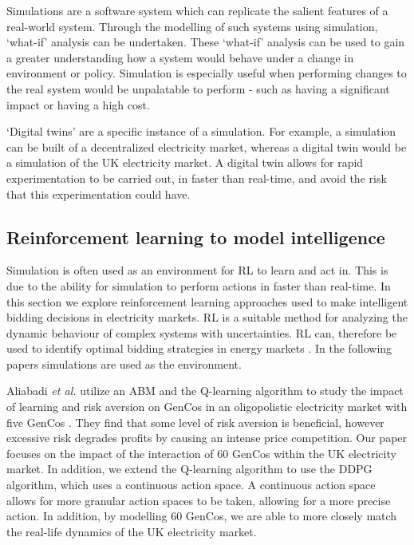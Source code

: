 \documentclass[conference]{IEEEtran}
\begin{document}
Simulations are a software system which can replicate the salient features of a real-world system. Through the modelling of such systems using simulation, `what-if' analysis can be undertaken. These `what-if' analysis can be used to gain a greater understanding how a system would behave under a change in environment or policy. Simulation is especially useful when performing changes to the real system would be unpalatable to perform - such as having a significant impact or having a high cost. 

`Digital twins' are a specific instance of a simulation. For example, a simulation can be built of a decentralized electricity market, whereas a digital twin would be a simulation of the UK electricity market. A digital twin allows for rapid experimentation to be carried out, in faster than real-time, and avoid the risk that this experimentation could have. 


\subsection{Reinforcement learning to model intelligence}

Simulation is often used as an environment for RL to learn and act in. This is due to the ability for simulation to perform actions in faster than real-time. In this section we explore reinforcement learning approaches used to make intelligent bidding decisions in electricity markets. RL is a suitable method for analyzing the dynamic behaviour of complex systems with uncertainties. RL can, therefore be used to identify optimal bidding strategies in energy markets \cite{Yang2020}. In the following papers simulations are used as the environment.


Aliabadi \textit{et al.} utilize an ABM and the Q-learning algorithm to study the impact of learning and risk aversion on GenCos in an oligopolistic electricity market with five GenCos \cite{EsmaeiliAliabadi2017}. They find that some level of risk aversion is beneficial, however excessive risk degrades profits by causing an intense price competition. Our paper focuses on the impact of the interaction of 60 GenCos within the UK electricity market. In addition, we extend the Q-learning algorithm to use the DDPG algorithm, which uses a continuous action space. A continuous action space allows for more granular action spaces to be taken, allowing for a more precise action. In addition, by modelling 60 GenCos, we are able to more closely match the real-life dynamics of the UK electricity market. 
\end{document}
